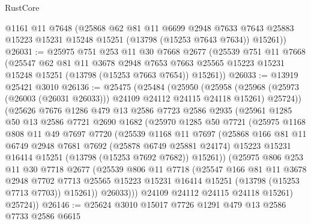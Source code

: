 \begin{lexlean}{RustCore}
\begin{coremodule}
      @1161
      @11
      @7648
      (@25868
        @62
        @81
        @11
        @6699
        @2948
        @7633
        @7643
        @25883
        @15223
        @15231
        @15248
        @15251
        (@13798 (@15253 @7643 @7634))
        @15261))
@26031 := @25975
    @751
    @253
    @11
    @30
    @7668
    @2677
    (@25539
      @751
      @11
      @7668
      (@25547
        @62
        @81
        @11
        @3678
        @2948
        @7653
        @7663
        @25565
        @15223
        @15231
        @15248
        @15251
        (@13798 (@15253 @7663 @7654))
        @15261))
@26033 := @13919 @25421 @3010
@26136 := @25475
    (@25484
      (@25950
        (@25958
          (@25968 (@25973 (@26003 (@26031 @26033))) @24109 @24112 @24115 @24118 @15261)
          @25724))
      (@25626
        @7676
        @1286
        @479
        @13
        @2586
        @7723
        @2586
        @2935
        (@25961
          @1285
          @50
          @13
          @2586
          @7721
          @2690
          @1682
          (@25970
            @1285
            @50
            @7721
            (@25975
              @1168
              @808
              @11
              @49
              @7697
              @7720
              (@25539
                @1168
                @11
                @7697
                (@25868
                  @166
                  @81
                  @11
                  @6749
                  @2948
                  @7681
                  @7692
                  (@25878 @6749 @25881 @24174)
                  @15223
                  @15231
                  @16414
                  @15251
                  (@13798 (@15253 @7692 @7682))
                  @15261))
              (@25975
                @806
                @253
                @11
                @30
                @7718
                @2677
                (@25539
                  @806
                  @11
                  @7718
                  (@25547
                    @166
                    @81
                    @11
                    @3678
                    @2948
                    @7702
                    @7713
                    @25565
                    @15223
                    @15231
                    @16414
                    @15251
                    (@13798 (@15253 @7713 @7703))
                    @15261))
                @26033)))
          @24109
          @24112
          @24115
          @24118
          @15261)
        @25724))
@26146 := @25624 @3010 @15017 @7726 @1291 @479 @13 @2586 @7733 @2586 @6615

\end{coremodule}
\end{lexlean}
